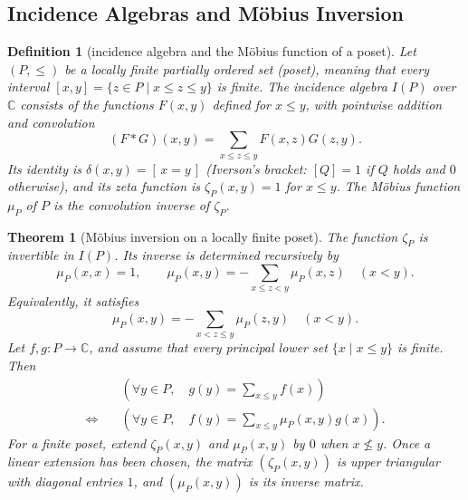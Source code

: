 \documentclass[11pt]{article}
\theoremstyle{ntstyle}
\newtheorem{theorem}{Theorem}[subsection]
\newtheorem{definition}{Definition}[subsection]
\begin{document}
\subsection{Incidence Algebras and M{\"o}bius Inversion}

\begin{definition}[incidence algebra and the M{\"o}bius function of a poset]\label{def:5.4.1} Let $(P,\le)$ be a locally finite partially ordered set (poset), meaning that every interval $[x,y]=\{z\in P \mid x\le z\le y\}$ is finite. The incidence algebra $I(P)$ over $\mathbb{C}$ consists of the functions $F(x,y)$ defined for $x\le y$, with pointwise addition and convolution
	\[
		(F*G)(x,y)=\sum_{x\le z\le y}F(x,z)G(z,y).
	\]
	Its identity is $\delta(x,y)=[\,x=y\,]$ (Iverson's bracket: $[Q]=1$ if $Q$ holds and $0$ otherwise), and its zeta function is $\zeta_P(x,y)=1$ for $x\le y$. The M{\"o}bius function $\mu_P$ of $P$ is the convolution inverse of $\zeta_P$.

\end{definition}
\begin{theorem}[M{\"o}bius inversion on a locally finite poset]\label{thm:5.4.1} The function $\zeta_P$ is invertible in $I(P)$. Its inverse is determined recursively by
	\[
		\mu_P(x,x)=1,\qquad
		\mu_P(x,y)=-\sum_{x\le z<y}\mu_P(x,z)\quad(x<y).
	\]
	Equivalently, it satisfies
	\[
		\mu_P(x,y)=-\sum_{x<z\le y}\mu_P(z,y)\quad(x<y).
	\]
	Let $f,g:P\to\mathbb{C}$, and assume that every principal lower set $\{x \mid x\le y\}$ is finite. Then
	\[
		\begin{aligned}
			&\left(\forall y\in P,\quad g(y)=\sum_{x\le y}f(x)\right)\\
			\Longleftrightarrow\quad
			&\left(\forall y\in P,\quad f(y)=\sum_{x\le y}\mu_P(x,y)g(x)\right).
		\end{aligned}
	\]
	For a finite poset, extend $\zeta_P(x,y)$ and $\mu_P(x,y)$ by $0$ when $x\nleq y$. Once a linear extension has been chosen, the matrix $(\zeta_P(x,y))$ is upper triangular with diagonal entries $1$, and $(\mu_P(x,y))$ is its inverse matrix.

\end{theorem}
\end{document}
